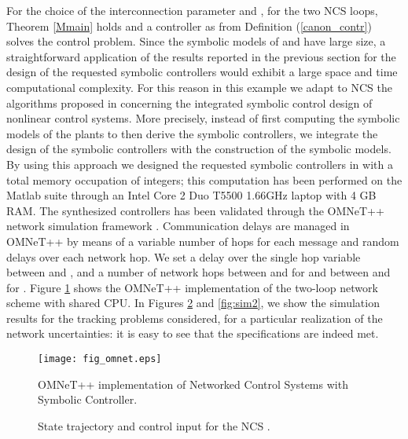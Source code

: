 \documentclass{amsart}
\begin{document}
For the choice of the interconnection parameter  and , for the two NCS loops, Theorem \ref{Mmain} holds and a controller  as from Definition (\ref{canon_contr}) solves the control problem. Since the symbolic models of  and  have large size, a straightforward application of the results reported in the previous section for the design of the requested symbolic controllers would exhibit a large space and time computational complexity. For this reason in this example we adapt to NCS the algorithms proposed in \cite{PolaTAC12} concerning the integrated symbolic control design of nonlinear control systems. More precisely, instead of first computing the symbolic models of the plants to then derive the symbolic controllers, we integrate the design of the symbolic controllers with the construction of the symbolic models. By using this approach we designed the requested symbolic controllers in  with a total memory occupation of  integers; this computation has been performed on the Matlab suite through an Intel Core 2 Duo T5500 1.66GHz laptop with 4 GB RAM. 
The synthesized controllers has been validated through the OMNeT++ network simulation framework \cite{Omnet}. Communication delays are managed in OMNeT++ by means of a variable number of hops for each message and random delays over each network hop. We set a delay over the single hop variable between  and , and a number of network hops between  and  for  and between  and  for . Figure \ref{fig:omnet_scheme} shows the OMNeT++ implementation of the two-loop network scheme with shared CPU.
In Figures \ref{fig:sim1} and \ref{fig:sim2}, we show the simulation results for the tracking problems considered, for a particular realization of the network uncertainties: it is easy to see that the specifications are indeed met.

\begin{figure}[ht]
\begin{center}
\texttt{[image: fig\_omnet.eps]}
\caption{OMNeT++ implementation of Networked Control Systems with Symbolic Controller.} 
\label{fig:omnet_scheme}
\end{center}
\end{figure}

\begin{figure}[ht]
\begin{center}
\caption{State trajectory and control input for the NCS .} 
\label{fig:sim1}
\end{center}
\end{figure}
\end{document}
